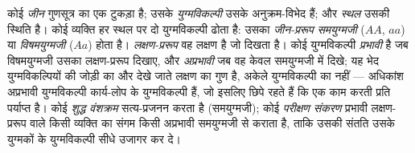 \begin{definition}[संकरणों की शब्दावली]\label{def:b2:meiosis-heredity:vocabulary}
कोई \emph{जीन} गुणसूत्र का एक टुकड़ा है; उसके \emph{युग्मविकल्पी} उसके
अनुक्रम-विभेद हैं; और \emph{स्थल} उसकी स्थिति है। कोई 
व्यक्ति हर स्थल पर दो युग्मविकल्पी ढोता है: उसका \emph{जीन-प्ररूप}
\emph{समयुग्मजी} ($AA$, $aa$) या \emph{विषमयुग्मजी} ($Aa$) होता है।
\emph{लक्षण-प्ररूप} वह लक्षण है जो दिखता है। कोई युग्मविकल्पी
\emph{प्रभावी} है जब विषमयुग्मजी उसका लक्षण-प्ररूप दिखाए, और
\emph{अप्रभावी} जब वह केवल समयुग्मजी में दिखे; यह भेद युग्मविकल्पियों
की जोड़ी का और देखे जाते लक्षण का गुण है, अकेले युग्मविकल्पी का नहीं ---
अधिकांश अप्रभावी युग्मविकल्पी कार्य-लोप के युग्मविकल्पी हैं, जो इसलिए
छिपे रहते हैं कि एक काम करती प्रति पर्याप्त है। कोई \emph{शुद्ध वंशक्रम}
सत्य-प्रजनन करता है (समयुग्मजी); कोई \emph{परीक्षण संकरण} प्रभावी
लक्षण-प्ररूप वाले किसी व्यक्ति का संगम किसी अप्रभावी समयुग्मजी से कराता
है, ताकि उसकी संतति उसके युग्मकों के युग्मविकल्पी सीधे उजागर कर दे।
\end{definition}

